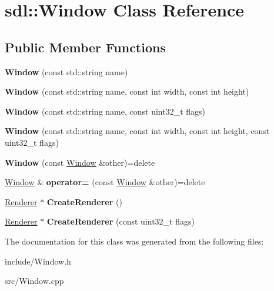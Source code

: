 \hypertarget{classsdl_1_1Window}{\section{sdl\-:\-:Window Class Reference}
\label{classsdl_1_1Window}
}
\subsection*{Public Member Functions}
\begin{DoxyCompactItemize}
\item 
\hypertarget{classsdl_1_1Window_a39a26091aa3fcd8b043816d33e57b91b}{{\bfseries Window} (const std\-::string name)}\label{classsdl_1_1Window_a39a26091aa3fcd8b043816d33e57b91b}

\item 
\hypertarget{classsdl_1_1Window_a8c1dcdc6090279451e96461d378722a4}{{\bfseries Window} (const std\-::string name, const int width, const int height)}\label{classsdl_1_1Window_a8c1dcdc6090279451e96461d378722a4}

\item 
\hypertarget{classsdl_1_1Window_a3368086b9e159382ebf5b1e23c905a06}{{\bfseries Window} (const std\-::string name, const uint32\-\_\-t flags)}\label{classsdl_1_1Window_a3368086b9e159382ebf5b1e23c905a06}

\item 
\hypertarget{classsdl_1_1Window_a0616c9466b4ad05efcf0a5e75cb07dc9}{{\bfseries Window} (const std\-::string name, const int width, const int height, const uint32\-\_\-t flags)}\label{classsdl_1_1Window_a0616c9466b4ad05efcf0a5e75cb07dc9}

\item 
\hypertarget{classsdl_1_1Window_a6c273a2d452fea90330fedd393eb9acb}{{\bfseries Window} (const \hyperlink{classsdl_1_1Window}{Window} \&other)=delete}\label{classsdl_1_1Window_a6c273a2d452fea90330fedd393eb9acb}

\item 
\hypertarget{classsdl_1_1Window_a871d1aa1cf1ed08cc01bb9e9c480d31a}{\hyperlink{classsdl_1_1Window}{Window} \& {\bfseries operator=} (const \hyperlink{classsdl_1_1Window}{Window} \&other)=delete}\label{classsdl_1_1Window_a871d1aa1cf1ed08cc01bb9e9c480d31a}

\item 
\hypertarget{classsdl_1_1Window_a13592c51d1a4986454d04c68c155f3a2}{\hyperlink{classsdl_1_1Renderer}{Renderer} $\ast$ {\bfseries Create\-Renderer} ()}\label{classsdl_1_1Window_a13592c51d1a4986454d04c68c155f3a2}

\item 
\hypertarget{classsdl_1_1Window_a2cea0d565cea2658bdf53b7ee561f68a}{\hyperlink{classsdl_1_1Renderer}{Renderer} $\ast$ {\bfseries Create\-Renderer} (const uint32\-\_\-t flags)}\label{classsdl_1_1Window_a2cea0d565cea2658bdf53b7ee561f68a}

\end{DoxyCompactItemize}


The documentation for this class was generated from the following files\-:\begin{DoxyCompactItemize}
\item 
include/Window.\-h\item 
src/Window.\-cpp\end{DoxyCompactItemize}
